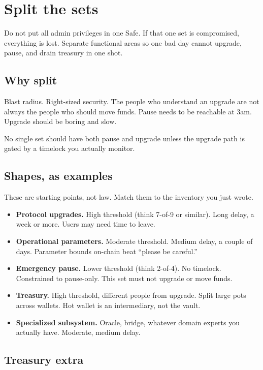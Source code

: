 \chapter{Split the sets}

Do not put all admin privileges in one Safe. If
that one set is compromised, everything is lost.
Separate functional areas so one bad day cannot
upgrade, pause, and drain treasury in one shot.

\section{Why split}

Blast radius. Right-sized security. The people who
understand an upgrade are not always the people who
should move funds. Pause needs to be reachable at
3am. Upgrade should be boring and slow.

No single set should have both pause and upgrade
unless the upgrade path is gated by a timelock
you actually monitor.

\section{Shapes, as examples}

These are starting points, not law. Match them to
the inventory you just wrote.

\begin{itemize}
  \item \textbf{Protocol upgrades.} High threshold
  (think 7-of-9 or similar). Long delay, a week or
  more. Users may need time to leave.
  \item \textbf{Operational parameters.} Moderate
  threshold. Medium delay, a couple of days.
  Parameter bounds on-chain beat ``please be
  careful.''
  \item \textbf{Emergency pause.} Lower threshold
  (think 2-of-4). No timelock. Constrained to
  pause-only. This set must not upgrade or move
  funds.
  \item \textbf{Treasury.} High threshold, different
  people from upgrade. Split large pots across
  wallets. Hot wallet is an intermediary, not the
  vault.
  \item \textbf{Specialized subsystem.} Oracle,
  bridge, whatever domain experts you actually
  have. Moderate, medium delay.
\end{itemize}

\section{Treasury extra}

